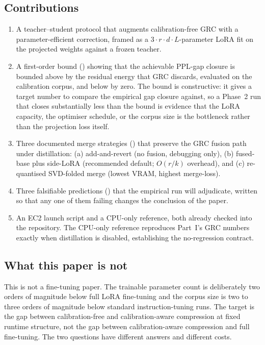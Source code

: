 \documentclass[11pt]{article}
\begin{document}
\subsection{Contributions}
\begin{enumerate}
\item A teacher--student protocol that augments calibration-free GRC
      with a parameter-efficient correction, framed as a
      $3 \cdot r \cdot d \cdot L$-parameter LoRA fit on the projected
      weights against a frozen teacher.
\item A first-order bound () showing that the
      achievable PPL-gap closure is bounded above by the residual energy
      that GRC discards, evaluated on the calibration corpus, and below
      by zero. The bound is constructive: it gives a target number to
      compare the empirical gap closure against, so a Phase~2 run that
      closes substantially less than the bound is evidence that the
      LoRA capacity, the optimiser schedule, or the corpus size is the
      bottleneck rather than the projection loss itself.
\item Three documented merge strategies () that
      preserve the GRC fusion path under distillation: (a)
      add-and-revert (no fusion, debugging only), (b) fused-base plus
      side-LoRA (recommended default; $O(r/k)$ overhead), and (c)
      re-quantised SVD-folded merge (lowest VRAM, highest merge-loss).
\item Three falsifiable predictions () that the
      empirical run will adjudicate, written so that any one of them
      failing changes the conclusion of the paper.
\item An EC2 launch script and a CPU-only reference, both already
      checked into the repository. The CPU-only reference reproduces
      Part~I's GRC numbers exactly when distillation is disabled,
      establishing the no-regression contract.
\end{enumerate}

\subsection{What this paper is not}
This is not a fine-tuning paper. The trainable parameter count is
deliberately two orders of magnitude below full LoRA fine-tuning
\cite{hu2021lora,dettmers2023qlora} and the corpus size is two to
three orders of magnitude below standard instruction-tuning runs. The
target is the gap between calibration-free and calibration-aware
compression at fixed runtime structure, not the gap between
calibration-aware compression and full fine-tuning. The two questions
have different answers and different costs.
\end{document}
